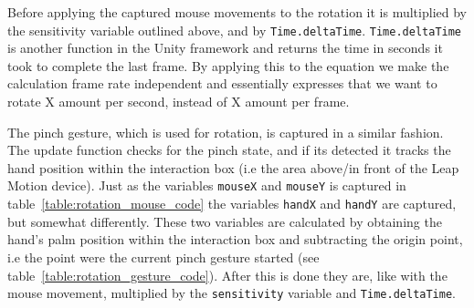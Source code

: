Before applying the captured mouse movements to the rotation it is multiplied by the sensitivity variable outlined above, and by \texttt{Time.\-deltaTime}.
\texttt{Time.\-deltaTime} is another function in the Unity framework and returns the time in seconds it took to complete the last frame.
By applying this to the equation we make the calculation frame rate independent and essentially expresses that we want to rotate X amount per second, instead of
X amount per frame.

The pinch gesture, which is used for rotation, is captured in a similar fashion. The update function checks for the pinch state, and if its detected
it tracks the hand position within the interaction box (i.e the area above/in front of the Leap Motion device). 
Just as the variables \texttt{mouseX} and \texttt{mouseY} is captured in table~\vref{table:rotation_mouse_code} the variables 
\texttt{handX} and \texttt{handY} are captured, but somewhat differently. These two variables are calculated by obtaining the hand's palm position within the interaction box
and subtracting the origin point, i.e the point were the current pinch gesture started (see table~\vref{table:rotation_gesture_code}). 
After this is done they are, like with the mouse movement, multiplied by the \texttt{sensitivity} variable and \texttt{Time.deltaTime}. 


